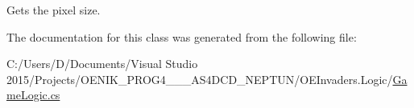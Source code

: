 Gets the pixel size. 



The documentation for this class was generated from the following file\+:\begin{DoxyCompactItemize}
\item 
C\+:/\+Users/\+D/\+Documents/\+Visual Studio 2015/\+Projects/\+O\+E\+N\+I\+K\+\_\+\+P\+R\+O\+G4\+\_\+\_\+\_\+\+A\+S4\+D\+C\+D\+\_\+\+N\+E\+P\+T\+U\+N/\+O\+E\+Invaders.\+Logic/\mbox{\hyperlink{_game_logic_8cs}{Game\+Logic.\+cs}}\end{DoxyCompactItemize}
